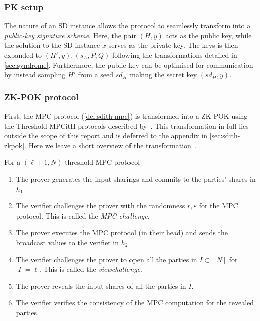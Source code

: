 \documentclass[11pt]{report}
\theoremstyle{definition}
\theoremstyle{plain}
\begin{document}
\subsubsection{PK setup}
The nature of an SD instance allows the protocol to seamlessly transform into a \textit{public-key signature scheme}. Here, the pair $(H, y)$ acts as the public key, while the solution to the SD instance $x$ serves as the private key. The keys is then expanded to $(H', y), (s_A, P, Q)$ following the transformations detailed in \autoref{sec:syndrome}. Furthermore, the public key can be optimised for communication by instead sampling $H'$ from a seed $sd_H$ making the secret key $(sd_H, y)$.

\subsubsection{ZK-POK protocol}
First, the MPC protocol (\autoref{def:sdith-mpc}) is transformed into a ZK-POK using the Threshold MPCitH protocols described by~\cite{feneuil2023threshold,feneuil2023threshold2}. This transformation in full lies outside the scope of this report and is deferred to the appendix in \autoref{sec:sdith-zkpok}. Here we leave a short overview of the transformation~\cite{aguilarsyndrome11}.

\begin{protocol}
  \label{pro:sdith-zkpok}
  For a $(\ell + 1, N)$-threshold MPC protocol
  \begin{enumerate}[parsep=0pt, itemsep=0pt, topsep=0pt]
    \item The prover generates the input sharings and commits to the parties' shares in $h_1$
    \item The verifier challenges the prover with the randomness \(r, \varepsilon\) for the MPC protocol. This is called the \textit{MPC challenge}.
    \item The prover executes the MPC protocol (in their head) and sends the broadcast values to the verifier in $h_2$
    \item The verifier challenges the prover to open all the parties in \(I \subset [N]\) for $|I| = \ell$. This is called the \textit{viewchallenge}.
    \item The prover reveals the input shares of all the parties in \(I\).
    \item The verifier verifies the consistency of the MPC computation for the revealed parties.
  \end{enumerate}
\end{protocol}
\end{document}
